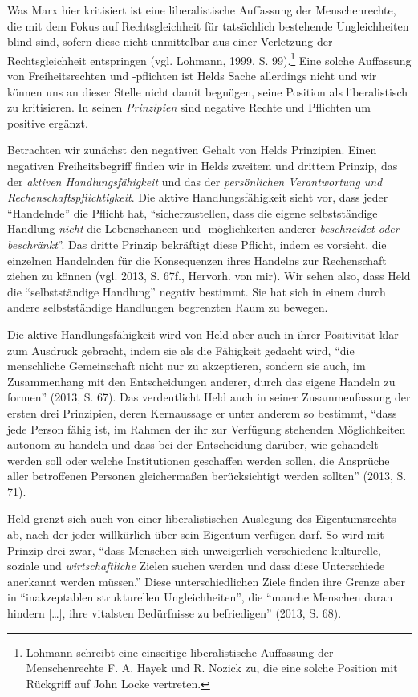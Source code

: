 \documentclass[ngerman,12pt, titlepage, smallheadings, nomath]{scrartcl}
\begin{document}
Was Marx hier kritisiert ist eine liberalistische Auffassung der
Menschenrechte, die mit dem Fokus auf Rechtsgleichheit für tatsächlich
bestehende Ungleichheiten blind sind, sofern diese nicht unmittelbar aus
einer Verletzung der Rechtsgleichheit entspringen (vgl. Lohmann, 1999,
S. 99).\footnote{Lohmann schreibt eine einseitige liberalistische
  Auffassung der Menschenrechte F. A. Hayek und R. Nozick zu, die eine
  solche Position mit Rückgriff auf John Locke vertreten.} Eine solche
Auffassung von Freiheitsrechten und -pflichten ist Helds Sache
allerdings nicht und wir können uns an dieser Stelle nicht damit
begnügen, seine Position als liberalistisch zu kritisieren. In seinen
\emph{Prinzipien} sind negative Rechte und Pflichten um positive
ergänzt.

Betrachten wir zunächst den negativen Gehalt von Helds Prinzipien. Einen
negativen Freiheitsbegriff finden wir in Helds zweitem und drittem
Prinzip, das der \emph{aktiven Handlungsfähigkeit} und das der
\emph{persönlichen Verantwortung und Rechenschaftspflichtigkeit}. Die
aktive Handlungsfähigkeit sieht vor, dass jeder \enquote{Handelnde} die
Pflicht hat, \enquote{sicherzustellen, dass die eigene selbstständige
Handlung \emph{nicht} die Lebenschancen und -möglichkeiten anderer
\emph{beschneidet oder beschränkt}}. Das dritte Prinzip bekräftigt diese
Pflicht, indem es vorsieht, die einzelnen Handelnden für die
Konsequenzen ihres Handelns zur Rechenschaft ziehen zu können (vgl.
2013, S. 67f., Hervorh. von mir). Wir sehen also, dass Held die
\enquote{selbstständige Handlung} negativ bestimmt. Sie hat sich in
einem durch andere selbstständige Handlungen begrenzten Raum zu bewegen.

Die aktive Handlungsfähigkeit wird von Held aber auch in ihrer
Positivität klar zum Ausdruck gebracht, indem sie als die Fähigkeit
gedacht wird, \enquote{die menschliche Gemeinschaft nicht nur zu
akzeptieren, sondern sie auch, im Zusammenhang mit den Entscheidungen
anderer, durch das eigene Handeln zu formen} (2013, S. 67). Das
verdeutlicht Held auch in seiner Zusammenfassung der ersten drei
Prinzipien, deren Kernaussage er unter anderem so bestimmt,
\enquote{dass jede Person fähig ist, im Rahmen der ihr zur Verfügung
stehenden Möglichkeiten autonom zu handeln und dass bei der Entscheidung
darüber, wie gehandelt werden soll oder welche Institutionen geschaffen
werden sollen, die Ansprüche aller betroffenen Personen gleichermaßen
berücksichtigt werden sollten} (2013, S. 71).

Held grenzt sich auch von einer liberalistischen Auslegung des
Eigentumsrechts ab, nach der jeder willkürlich über sein Eigentum
verfügen darf. So wird mit Prinzip drei zwar, \enquote{dass Menschen
sich unweigerlich verschiedene kulturelle, soziale und
\emph{wirtschaftliche} Zielen suchen werden und dass diese Unterschiede
anerkannt werden müssen.} Diese unterschiedlichen Ziele finden ihre
Grenze aber in \enquote{inakzeptablen strukturellen Ungleichheiten}, die
\enquote{manche Menschen daran hindern {[}\ldots{}{]}, ihre vitalsten
Bedürfnisse zu befriedigen} (2013, S. 68).
\end{document}
